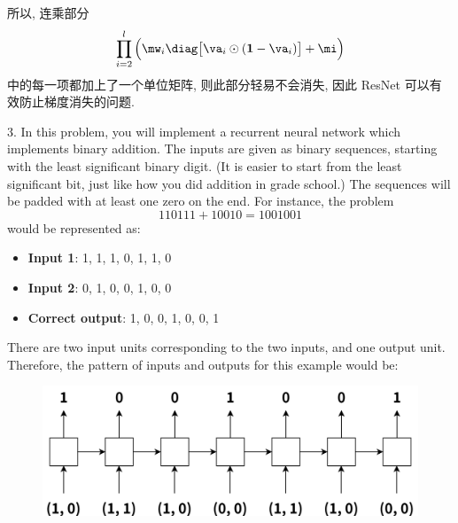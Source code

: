 \documentclass[openany]{ctexbook}
\theoremstyle{kaiti}
\theoremstyle{normal}
\begin{document}
所以, 连乘部分 $$\prod_{i=2}^l\Big(\mw_i\diag\big[\va_i\odot(\bm{1}-\va_i)\big]+\mi\Big)$$ 中的每一项都加上了一个单位矩阵, 则此部分轻易不会消失, 因此 ResNet 可以有效防止梯度消失的问题.


3. In this problem, you will implement a recurrent neural network which implements binary addition. The inputs are given as binary sequences, starting with the least significant binary digit. (It is easier to start from the least significant bit, just like how you did addition in grade school.) The sequences will be padded with at least one zero on the end. For instance, the problem
\begin{equation}
  110111+10010=1001001
\end{equation}
would be represented as:
\begin{itemize}
  \item \textbf{Input 1}: 1, 1, 1, 0, 1, 1, 0 
  \item \textbf{Input 2}: 0, 1, 0, 0, 1, 0, 0 
  \item \textbf{Correct output}: 1, 0, 0, 1, 0, 0, 1 
\end{itemize}

There are two input units corresponding to the two inputs, and one output unit. Therefore, the pattern of inputs and outputs for this example would be:
\begin{figure}[!ht]
   \centering
   \includegraphics[scale=0.5]{fig1.png}
   \label{fig:1_1}
\end{figure}
\end{document}
